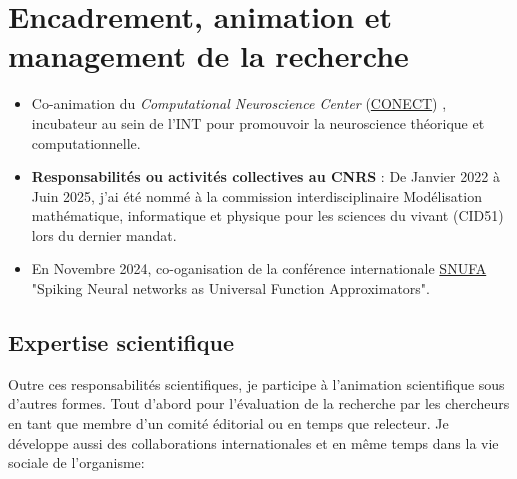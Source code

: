 \documentclass[10pt,french,a4paper,twoside]{article}%
\begin{document}
\section{Encadrement, animation et management de la recherche}



\begin{itemize}
	
	\item Co-animation du \og \textit{Computational Neuroscience Center} (\href{https://conect-int.github.io/}{CONECT}) \fg{}, incubateur au sein de l’INT pour promouvoir la neuroscience théorique et computationnelle.
	
    \item \textbf{Responsabilités ou activités collectives au CNRS} : De Janvier 2022 à Juin 2025, j'ai été nommé à la commission interdisciplinaire \og Modélisation mathématique, informatique et physique pour les sciences du vivant \fg{} (CID51) lors du dernier mandat.
	
	\item En Novembre 2024, co-oganisation de la conférence internationale \href{https://laurentperrinet.github.io/post/2024-11-08-snufa/}{SNUFA} "Spiking Neural networks as Universal Function Approximators".
\end{itemize}

\subsection{Expertise scientifique} %


Outre ces responsabilités scientifiques, je participe à l'animation scientifique sous d'autres formes. Tout d'abord pour l'évaluation de la recherche par les chercheurs en tant que membre d'un comité éditorial ou en temps que relecteur. Je développe aussi des collaborations internationales et en même temps dans la vie sociale de l'organisme:
\end{document}

